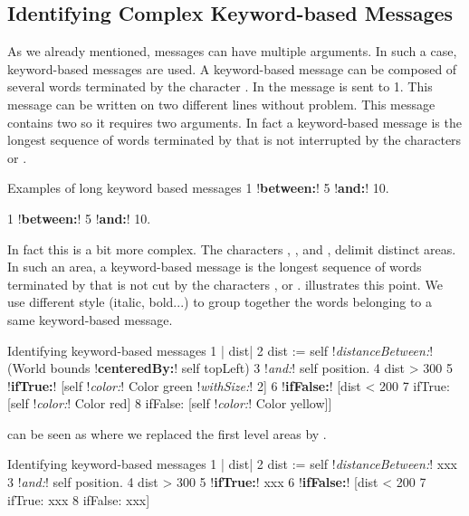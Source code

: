 \documentclass[a4paper,10pt,twoside]{book}
\begin{document}
\subsection{Identifying Complex Keyword-based Messages}

As we already mentioned, messages can have multiple arguments. In such a case, keyword-based messages are used. A keyword-based message can be composed of several words terminated by the character \ct{:}. In  the message  is sent to 1. This message can be written on two different lines without problem. This message contains two \ct{:} so it requires two arguments. In fact a keyword-based message is the longest sequence of words terminated by \ct{:} that is not interrupted by the characters  or \ct{;}.

\begin{script}{Examples of long keyword based messages}\label{scr:longkey}
1 !\textbf{between:}! 5 !\textbf{and:}! 10.

1 !\textbf{between:}! 5 
  !\textbf{and:}! 10.
\end{script}

In fact this is a bit more complex. The characters \ct{[}, \ct{]}, and \ct{(}, \ct{)} delimit distinct areas. In such an area, a keyword-based message is the longest sequence  of words terminated by \ct{:} that is not cut by the characters ,  or \ct{;}.   illustrates this point.
We use different style (italic, bold...) to group together the words belonging to a same keyword-based message.

\begin{script}{Identifying keyword-based messages}\label{scr:keywordComplex}
1   | dist| 
2   dist := self !\textit{distanceBetween:}! (World bounds !\textbf{centeredBy:}! self topLeft)
3                !\textit{and:}! self position.
4   dist > 300
5      !\textbf{ifTrue:}! [self !\textit{color:}! Color green !\textit{withSize:}! 2]
6      !\textbf{ifFalse:}! [dist < 200
7         ifTrue: [self !\textit{color:}! Color red]
8         ifFalse: [self !\textit{color:}! Color yellow]]
\end{script}

 can be seen as  where we replaced the first level areas by . 

\begin{script}{Identifying keyword-based messages}\label{scr:keywordComplex2}
1   | dist| 
2   dist := self !\textit{distanceBetween:}! xxx
3                !\textit{and:}! self position.
4   dist > 300
5      !\textbf{ifTrue:}! xxx
6      !\textbf{ifFalse:}! [dist < 200
7         ifTrue: xxx
8         ifFalse: xxx]
\end{script}
\end{document}
